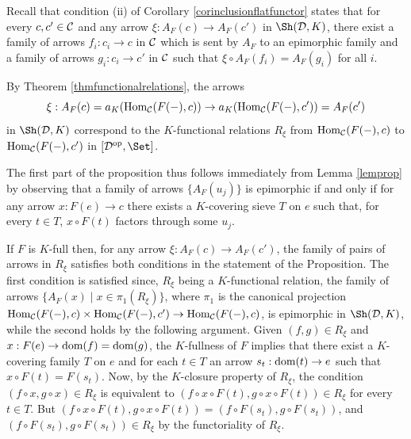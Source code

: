 \documentclass[a4paper,12pt]{article}
\begin{document}
\begin{proofs}
	Recall that condition (ii) of Corollary \ref{corinclusionflatfunctor} states that for every $c, c'\in {\cal C}$ and any arrow $\xi:A_{F}(c)\to A_{F}(c')$ in $\Sh({\cal D}, K)$, there exist a family of arrows $f_{i}:c_{i}\to c$ in $\cal C$ which is sent by $A_{F}$ to an epimorphic family and a family of arrows $g_{i}:c_{i}\to c'$ in $\cal C$ such that $\xi\circ A_{F}(f_{i})=A_{F}(g_{i})$ for all $i$.
	
	By Theorem \ref{thmfunctionalrelations}, the arrows $$\xi:A_{F}(c)=a_{K}(\textup{Hom}_{\cal C}(F(-),c))\to a_{K}(\textup{Hom}_{\cal C}(F(-),c'))=A_{F}(c')$$ in $\Sh({\cal D}, K)$ correspond to the $K$-functional relations $R_{\xi}$ from $\textup{Hom}_{\cal C}(F(-),c)$ to $\textup{Hom}_{\cal C}(F(-),c')$ in $[{\cal D}^{\textup{op}},\Set]$. 
	
	The first part of the proposition thus follows immediately from Lemma \ref{lemprop} by observing that a family of arrows $\{A_{F}(u_{j})\}$ is epimorphic if and only if for any arrow $x:F(e)\to c$ there exists a $K$-covering sieve $T$ on $e$ such that, for every $t\in T$, $x\circ F(t)$ factors through some $u_{j}$. 
	
	If $F$ is $K$-full then, for any arrow $\xi:A_{F}(c) \to A_{F}(c')$, the family of pairs of arrows in $R_{\xi}$ satisfies both conditions in the statement of the Proposition. The first condition is satisfied since, $R_{\xi}$ being a $K$-functional relation, the family of arrows $\{A_{F}(x) \mid x\in \pi_{1}(R_{\xi}) \}$, where $\pi_{1}$ is the canonical projection $\textup{Hom}_{\cal C}(F(-),c)\times \textup{Hom}_{\cal C}(F(-),c') \to \textup{Hom}_{\cal C}(F(-),c)$, is epimorphic in $\Sh({\cal D}, K)$, while the second holds by the following argument. Given $(f,g)\in R_{\xi}$ and $x:F(e)\to  \textup{dom}(f)=\textup{dom}(g)$, the $K$-fullness of $F$ implies that there exist a $K$-covering family $T$ on $e$ and for each $t\in T$ an arrow $s_{t}:\textup{dom}(t)\to e$ such that $x\circ F(t)=F(s_{t})$. Now, by the $K$-closure property of $R_{\xi}$, the condition $(f\circ x, g\circ x)\in R_{\xi}$ is equivalent to $(f\circ x\circ F(t),  g\circ x\circ F(t))\in R_{\xi}$ for every $t\in T$. But $(f\circ x\circ F(t),  g\circ x\circ F(t))=(f\circ F(s_{t}), g\circ F(s_{t}))$, and  $(f\circ F(s_{t}), g\circ F(s_{t}))\in R_{\xi}$ by the functoriality of $R_{\xi}$. 
	

\end{proofs}
\end{document}
